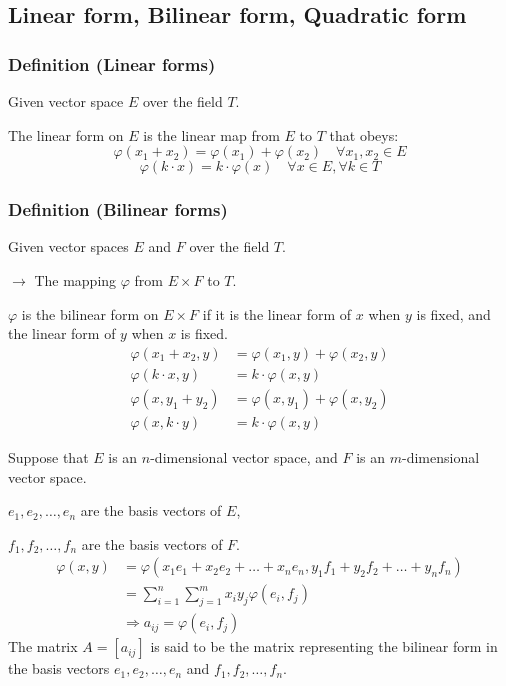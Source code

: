 \subsection{Linear form, Bilinear form, Quadratic form}
\subsubsection{Definition (Linear forms)}

Given vector space $E$ over the field $T$.

The linear form on $E$ is the linear map from $E$ to $T$ that obeys:
\[
\varphi(x_1 + x_2) = \varphi(x_1) + \varphi(x_2) \quad \forall x_1, x_2 \in E
\]
\[
\varphi(k \cdot x) = k \cdot \varphi(x) \quad \forall x \in E, \forall k \in T
\]
\subsubsection{Definition (Bilinear forms)}

Given vector spaces $E$ and $F$ over the field $T$.

$\rightarrow$ The mapping $\varphi$ from $E \times F$ to $T$.

$\varphi$ is the bilinear form on $E \times F$ if it is the linear form of $x$ when $y$ is fixed, and the linear form of $y$ when $x$ is fixed.
\begin{align*}
    \varphi(x_1 + x_2, y) &= \varphi(x_1, y) + \varphi(x_2, y)\\
    \varphi(k \cdot x, y) &= k \cdot \varphi(x, y)\\
    \varphi(x, y_1 + y_2) &= \varphi(x, y_1) + \varphi(x, y_2)\\
    \varphi(x, k \cdot y) &= k \cdot \varphi(x, y)
\end{align*}


Suppose that $E$ is an $n$-dimensional vector space, and $F$ is an $m$-dimensional vector space.

$e_1, e_2, \ldots, e_n$ are the basis vectors of $E$,

$f_1, f_2, \ldots, f_n$ are the basis vectors of $F$.
\begin{align*}
    \varphi(x, y) &= \varphi(x_1 e_1 + x_2 e_2 + \ldots + x_n e_n, y_1 f_1 + y_2 f_2 + \ldots + y_n f_n)\\
    &= \sum^n_{i=1}\sum^m_{j=1}x_iy_j\varphi(e_i, f_j)\\
    &\Rightarrow a_{ij} = \varphi(e_i, f_j)
\end{align*}
The matrix $A = [a_{ij}]$ is said to be the matrix representing the bilinear form in the basis vectors $e_1, e_2, \ldots, e_n$ and $f_1, f_2, \ldots, f_n$.

